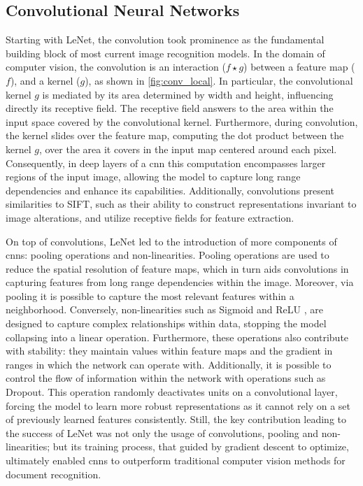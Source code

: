 \subsection{Convolutional Neural Networks}
\label{rel:sub_cnn}
Starting with LeNet, the convolution took prominence as the fundamental building block 
of most current image recognition models. In the domain of computer vision, the convolution is an 
interaction ($f\star g$) between a feature map ($f$), and a kernel ($g$), as shown in  
\autoref{fig:conv_local}. In particular, the convolutional kernel $g$ is mediated by its area 
determined by width and height, influencing directly its receptive field. The 
receptive field answers to the area within the input space covered by the convolutional kernel. 
Furthermore, during convolution, the kernel slides over the feature map, computing the dot product 
between the kernel $g$, over the area it covers in the input map centered around each pixel. 
Consequently, in deep layers of a \gls{cnn} this computation encompasses larger regions of the 
input image, allowing the model to capture long range dependencies and enhance its capabilities. 
Additionally, convolutions present similarities to SIFT, such as their ability to construct 
representations invariant to image alterations, and utilize receptive fields for feature extraction.


\noindent On top of convolutions, LeNet led to the introduction of more components of \glspl{cnn}: 
pooling operations and non-linearities. Pooling operations are used to reduce the spatial 
resolution of feature maps, which in turn aids convolutions in capturing features from long 
range dependencies within the image. Moreover, via pooling it is possible to capture the most 
relevant features within a neighborhood.
Conversely, non-linearities such as Sigmoid and ReLU \autocite{fukushima1969visual}, are designed to 
capture complex relationships within data, stopping the model collapsing into a linear operation. 
Furthermore, these operations also contribute with stability: they maintain values within feature 
maps and the gradient in ranges in which the network can operate with. Additionally, it is possible 
to control the flow of information within the network with operations such as Dropout. This 
operation randomly deactivates units on a convolutional layer, forcing the model to learn more 
robust representations as it cannot rely on a set of previously learned features consistently. %
Still, the key contribution leading to the success of LeNet was not only the usage of 
convolutions, pooling and non-linearities; but its training process, that guided by gradient descent 
to optimize, ultimately enabled \glspl{cnn} to outperform traditional computer vision methods for 
document recognition. \\

